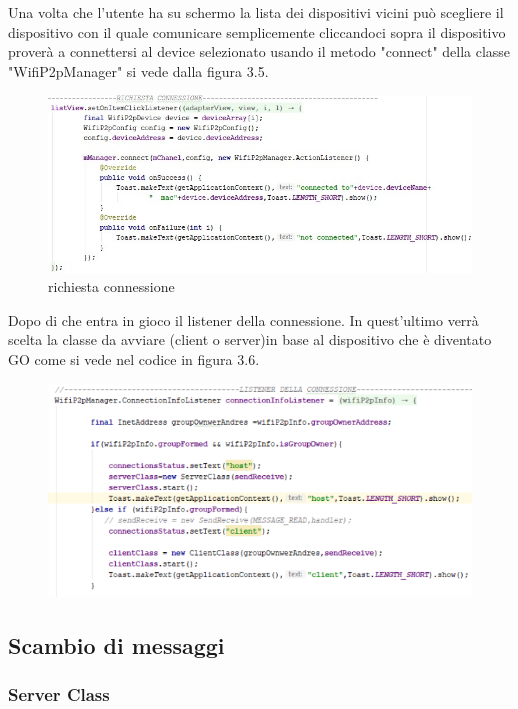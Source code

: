Una volta che l'utente ha su schermo la lista dei dispositivi
vicini può scegliere il dispositivo con il quale comunicare
semplicemente cliccandoci sopra il dispositivo proverà a
connettersi al device selezionato usando il metodo "connect"
della classe "WifiP2pManager" si vede dalla figura 3.5.
\begin{figure}
   \caption{richiesta connessione}
   \includegraphics[width=1\columnwidth]{imgs/Connect.png}
\end{figure}
Dopo di che entra in gioco il listener della connessione.
In quest'ultimo verrà scelta la classe da avviare
(client o server)in base al dispositivo che è
diventato GO come si vede nel codice in figura 3.6.
\begin{figure}
   \caption{}
   \includegraphics[width=1\columnwidth]{imgs/listenerConeessione.png}
\end{figure}

\subsection{Scambio di messaggi}

\subsubsection{Server Class}

